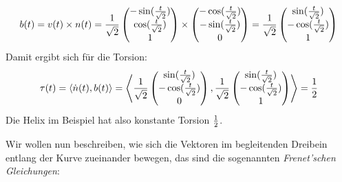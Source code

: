 \documentclass[11pt]{scrbook}
\newcommand{\kp}{\times} 	 		%
\begin{document}
\begin{ex*}

\[ b(t) = v(t) \kp n(t) = \f{1}{\sqrt{2}}  \begin{pmatrix} -\sin(\f{t}{\sqrt{2}}) \\ \cos(\f{t}{\sqrt{2}}) \\ 1 \end{pmatrix} \kp \begin{pmatrix} -\cos(\f{t}{\sqrt{2}}) \\ -\sin(\f{t}{\sqrt{2}}) \\ 0 \end{pmatrix}  = \f{1}{\sqrt{2}} \begin{pmatrix} \sin(\f{t}{\sqrt{2}}) \\ -\cos(\f{t}{\sqrt{2}}) \\ 1 \end{pmatrix}  \]
Damit ergibt sich für die Torsion:
\[ \tau(t) = \langle \dot n(t), b(t) \rangle  = \left\langle \frac{1}{\sqrt{2}}  \begin{pmatrix} \sin(\frac{t}{\sqrt{2}}) \\ -\cos(\frac{t}{\sqrt{2}}) \\ 0 \end{pmatrix} , \frac{1}{\sqrt{2}} \begin{pmatrix} \sin(\frac{t}{\sqrt{2}}) \\ -\cos(\frac{t}{\sqrt{2}}) \\ 1 \end{pmatrix} \right\rangle  = \frac{1}{2} \]
Die Helix im Beispiel hat also konstante Torsion $\frac{1}{2}$.
\end{ex*}

Wir wollen nun beschreiben, wie sich die Vektoren im begleitenden Dreibein entlang der Kurve zueinander bewegen, das sind die sogenannten \emph{Frenet'schen Gleichungen}:
\end{document}

